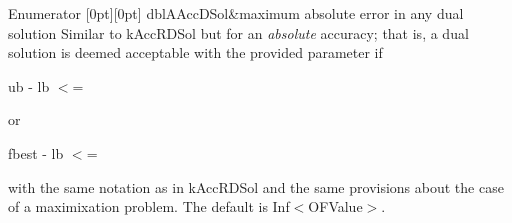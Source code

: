\begin{DoxyEnumFields}{Enumerator}
[0pt][0pt]{}\mbox{\label{class_s_m_spp__di__unipi__it_1_1_c_d_a_solver_a12473d2c0cbab01587927c637e3f7e4ba054bbc58a2d8652169db874942c1338d}} 
dbl\+A\+Acc\+D\+Sol&maximum absolute error in any dual solution Similar to k\+Acc\+R\+D\+Sol but for an {\itshape absolute} accuracy; that is, a dual solution is deemed acceptable with the provided parameter  if

ub -\/ lb $<$= 

or

fbest -\/ lb $<$= 

with the same notation as in k\+Acc\+R\+D\+Sol and the same provisions about the case of a maximixation problem. The default is Inf$<$\+O\+F\+Value$>$. \\
\hline


\end{DoxyEnumFields}
